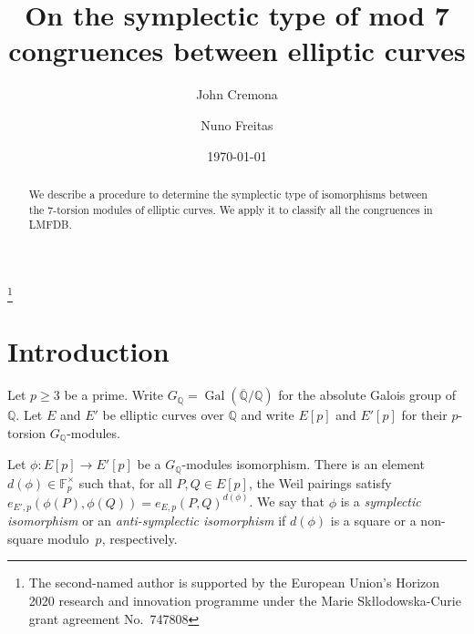 \documentclass[12pt]{amsart}
\newcommand{\F}{\mathbb{F}}
\newcommand{\Q}{\mathbb{Q}}
\newcommand{\Qbar}{{\overline{\Q}}}
\DeclareMathOperator{\Gal}{Gal}
\numberwithin{equation}{section}
\theoremstyle{definition}
\theoremstyle{remark}
\begin{document}
\title{On the symplectic type of mod 7 congruences between elliptic curves}

\author{John Cremona}
\address{Mathematics Institute,
         University of Warwick,
         Coventry CV4 7AL,
         United Kingdom}


\author{Nuno Freitas}
\address{Mathematics Institute,
         University of Warwick,
         Coventry CV4 7AL,
         United Kingdom}


\date{\today}


\thanks{The second-named author is
supported by the
European Union's Horizon 2020 research and innovation programme under the Marie Sk\l{l}odowska-Curie grant 
agreement No.\ 747808}


\maketitle

\begin{abstract} 
We describe a procedure to determine the symplectic type of isomorphisms between the $7$-torsion modules of elliptic curves.
We apply it to classify all the congruences in LMFDB.
\end{abstract}

\section{Introduction}

Let $p \geq 3$ be a prime. Write $G_\Q = \Gal(\Qbar/\Q)$ for 
the absolute Galois group of $\Q$. 
Let $E$ and $E'$ be elliptic curves over $\Q$ and write 
$E[p]$ and $E'[p]$ for their $p$-torsion $G_\Q$-modules. 

Let $\phi : E[p] \to E'[p]$ be a $G_\Q$-modules isomorphism.
There is an element $d(\phi) \in \F_p^\times$ such that,
for all $P, Q \in E[p]$, the Weil pairings satisfy
$e_{E',p}(\phi(P), \phi(Q)) = e_{E,p}(P, Q)^{d(\phi)}$.
We say that $\phi$ is a {\it symplectic isomorphism} or an
{\it anti-symplectic isomorphism}
if $d(\phi)$ is a square or a non-square modulo~$p$, 
respectively.
\end{document}
